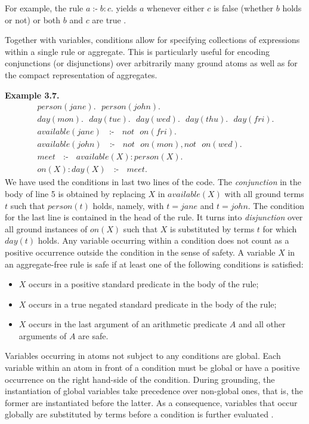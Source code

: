 \documentclass[14pt,a4paper, titlepage]{article}
\DeclareMathOperator{\leftimpl}{:-}
\begin{document}
For example, the rule $\mathit{a \leftimpl b : c.}$ yields $a$ whenever either $c$ is false (whether $b$ holds or not) or both $b$ and $c$ are true \cite{pott}.

Together  with variables, conditions allow for specifying collections of expressions within a single rule or aggregate. This is particularly useful for encoding conjunctions (or disjunctions) over arbitrarily many ground atoms as well as for the compact representation of aggregates. 

\textbf{Example 3.7.}
\begin{align*}
& \mathit{person}(\mathit{jane}). \text{ } \mathit{person}(\mathit{john}).\\
& \mathit{day}(\mathit{mon}). \text{ } \mathit{day}(\mathit{tue}). \text{ } \mathit{day}(\mathit{wed}). \text{ } \mathit{day}(\mathit{thu}). \text{ } \mathit{day}(\mathit{fri}). \text{ }\\
& \mathit{available}(\mathit{jane}) \text{ } \leftimpl \text{ } not \text{ } \mathit{on}(\mathit{fri}).\\
& \mathit{available}(\mathit{john})\text{ } \leftimpl \text{ } \mathit{not} \text{ } \mathit{on}(\mathit{mon}), \mathit{not}  \text{ } \mathit{on}(\mathit{wed}).\\
& \mathit{meet} \text{ } \leftimpl \text{ } \mathit{available}(X) : \mathit{person}(X).\\
& \mathit{on}(X) : \mathit{day}(X) \text{ } \leftimpl \text{ } \mathit{meet}.
\end{align*}  
We have used the conditions in last two lines of the code. The \emph{conjunction} in the body of line 5 is obtained by replacing $X$ in $\mathit{available(X)}$ with all ground terms $t$ such that $\mathit{person(t)}$ holds, namely, with $\mathit{t=jane}$ and $\mathit{t=john}$. The condition for the last line is contained in the head of the rule. It turns into \emph{disjunction} over all ground instances of $\mathit{on(X)}$ such that $X$ is substituted by terms $t$ for which $\mathit{day(t)}$ holds. Any variable occurring within a condition does not count as a positive occurrence outside the condition in the sense of safety. A variable $X$ in an aggregate-free rule is safe if at least one of the following conditions is satisfied:
\begin{itemize}
\item $X$ occurs in a positive standard predicate in the body of the rule;
\item $X$ occurs in a true negated standard predicate in the body of the rule;
\item $X$ occurs in the last argument of an arithmetic predicate $A$ and all other arguments of $A$ are safe.
\end{itemize}
Variables occurring in atoms not subject to any conditions are global. Each variable within an atom in front of a condition must be global or have a positive occurrence on the right hand-side of the condition. During grounding, the instantiation of global variables take precedence over non-global ones, that is, the former are instantiated before the latter. As a consequence, variables that occur globally are substituted by terms before a condition is further evaluated \cite{pott}.    
\end{document}
